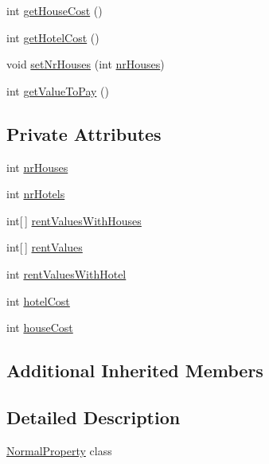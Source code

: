 \begin{DoxyCompactItemize}
\item 
int \hyperlink{class_monopoly_1_1_logic_1_1_normal_property_a09771e07034d21b288f0cb8afd0e4368}{get\+House\+Cost} ()
\item 
int \hyperlink{class_monopoly_1_1_logic_1_1_normal_property_ac69e1342451e1a6f435c4d5b1f86be7d}{get\+Hotel\+Cost} ()
\item 
void \hyperlink{class_monopoly_1_1_logic_1_1_normal_property_a0dde535ebff6816c3b00a715d1c439c6}{set\+Nr\+Houses} (int \hyperlink{class_monopoly_1_1_logic_1_1_normal_property_a7e951cc0cdfc94ab74fffa59d8bd32db}{nr\+Houses})
\item 
int \hyperlink{class_monopoly_1_1_logic_1_1_normal_property_a9d90ab9578fe29eb12cc61ea00313e50}{get\+Value\+To\+Pay} ()
\end{DoxyCompactItemize}
\subsection*{Private Attributes}
\begin{DoxyCompactItemize}
\item 
int \hyperlink{class_monopoly_1_1_logic_1_1_normal_property_a7e951cc0cdfc94ab74fffa59d8bd32db}{nr\+Houses}
\item 
int \hyperlink{class_monopoly_1_1_logic_1_1_normal_property_a7f62c52daa430cbf8ea0b6ebf15ada1f}{nr\+Hotels}
\item 
int\mbox{[}$\,$\mbox{]} \hyperlink{class_monopoly_1_1_logic_1_1_normal_property_a918c6693fd0638db23698322ae3fdad3}{rent\+Values\+With\+Houses}
\item 
int\mbox{[}$\,$\mbox{]} \hyperlink{class_monopoly_1_1_logic_1_1_normal_property_aae8931ab4d7d9ca32d507ca34141e48d}{rent\+Values}
\item 
int \hyperlink{class_monopoly_1_1_logic_1_1_normal_property_af1d8fcccf72faa5a718594967213ba55}{rent\+Values\+With\+Hotel}
\item 
int \hyperlink{class_monopoly_1_1_logic_1_1_normal_property_a59afe77a19e7be091e59408b8d25f4f6}{hotel\+Cost}
\item 
int \hyperlink{class_monopoly_1_1_logic_1_1_normal_property_af9453c7887211e8305c482b065b3909b}{house\+Cost}
\end{DoxyCompactItemize}
\subsection*{Additional Inherited Members}


\subsection{Detailed Description}
\hyperlink{class_monopoly_1_1_logic_1_1_normal_property}{Normal\+Property} class 

